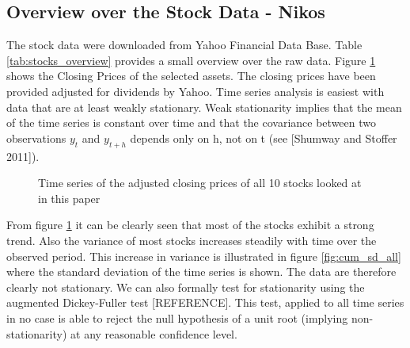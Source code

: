 \subsection{Overview over the Stock Data - Nikos}
The stock data were downloaded from Yahoo Financial Data Base. Table \ref{tab:stocks_overview} provides a small overview over the raw data. Figure \ref{fig:Daily Stock Prices for all Stocks in the Data Set} shows the Closing Prices of the selected assets. The closing prices have been provided adjusted for dividends by Yahoo. Time series analysis is easiest with data that are at least weakly stationary. Weak stationarity implies that the mean of the time series is constant over time and that the covariance between two observations $y_t$ and $y_{t+h}$ depends only on h, not on t (see [Shumway and Stoffer 2011]). 

\begin{table}[]
    \centering
    \begin{adjustbox}{width = 0.9\linewidth}
    \setlength{\tabcolsep}{15pt}
    
    \end{adjustbox}
    \caption{}
    \label{tab:stocks_overview}
\end{table}{}

\begin{figure}[h]
    \centering
    \begin{adjustbox}{width=.9\textwidth,center}
    
    \end{adjustbox}  
    \caption{Time series of the adjusted closing prices of all 10 stocks looked at in this paper}
    \label{fig:Daily Stock Prices for all Stocks in the Data Set}
\end{figure}{}

From figure \ref{fig:Daily Stock Prices for all Stocks in the Data Set} it can be clearly seen that most of the stocks exhibit a strong trend. Also the variance of most stocks increases steadily with time over the observed period. This increase in variance is illustrated in figure \ref{fig:cum_sd_all} where the standard deviation of the time series is shown. The data are therefore clearly not stationary. We can also formally test for stationarity using the augmented Dickey-Fuller test [REFERENCE]. This test, applied to all time series in no case is able to reject the null hypothesis of a unit root (implying non-stationarity) at any reasonable confidence level. 


